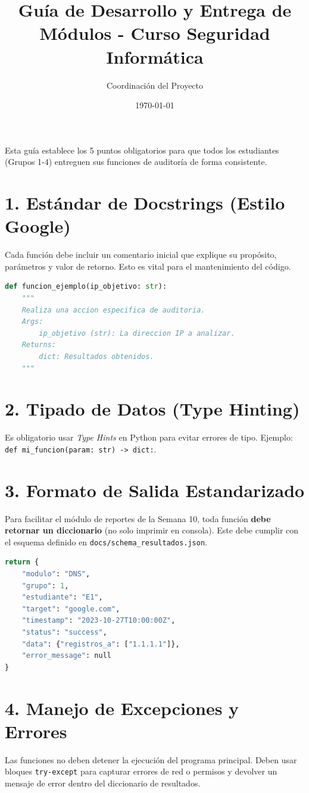\documentclass{article}
\title{Guía de Desarrollo y Entrega de Módulos - Curso Seguridad Informática}
\author{Coordinación del Proyecto}
\date{\today}
\begin{document}
\maketitle

Esta guía establece los 5 puntos obligatorios para que todos los estudiantes (Grupos 1-4) entreguen sus funciones de auditoría de forma consistente.

\section*{1. Estándar de Docstrings (Estilo Google)}
Cada función debe incluir un comentario inicial que explique su propósito, parámetros y valor de retorno. Esto es vital para el mantenimiento del código.
\begin{lstlisting}[language=Python]
def funcion_ejemplo(ip_objetivo: str):
    """
    Realiza una accion especifica de auditoria.
    Args:
        ip_objetivo (str): La direccion IP a analizar.
    Returns:
        dict: Resultados obtenidos.
    """
\end{lstlisting}

\section*{2. Tipado de Datos (Type Hinting)}
Es obligatorio usar \textit{Type Hints} en Python para evitar errores de tipo. Ejemplo: \texttt{def mi\_funcion(param: str) -> dict:}.

\section*{3. Formato de Salida Estandarizado}
Para facilitar el módulo de reportes de la Semana 10, toda función \textbf{debe retornar un diccionario} (no solo imprimir en consola).
Este debe cumplir con el esquema definido en \texttt{docs/schema\_resultados.json}.
\begin{lstlisting}[language=Python]
return {
    "modulo": "DNS",
    "grupo": 1,
    "estudiante": "E1",
    "target": "google.com",
    "timestamp": "2023-10-27T10:00:00Z",
    "status": "success",
    "data": {"registros_a": ["1.1.1.1"]},
    "error_message": null
}
\end{lstlisting}

\section*{4. Manejo de Excepciones y Errores}
Las funciones no deben detener la ejecución del programa principal. Deben usar bloques \texttt{try-except} para capturar errores de red o permisos y devolver un mensaje de error dentro del diccionario de resultados.
\end{document}
